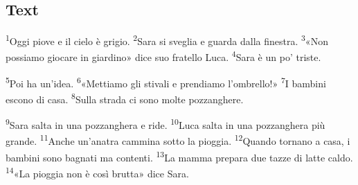 \documentclass[11pt,a4paper,twoside,openright]{book}
\newenvironment{storytext}{\par\begingroup\large\setlength{\parskip}{8pt}\linespread{1.15}\selectfont}{\par\endgroup}
\newcommand{\sentnum}[1]{\textsuperscript{\color{muted}\tiny #1}}
\begin{document}
\subsection*{Text}
\begin{storytext}
\sentnum{1}Oggi piove e il cielo è grigio. \sentnum{2}Sara si sveglia e guarda dalla finestra. \sentnum{3}«Non possiamo giocare in giardino» dice suo fratello Luca. \sentnum{4}Sara è un po' triste.\par
\sentnum{5}Poi ha un'idea. \sentnum{6}«Mettiamo gli stivali e prendiamo l'ombrello!» \sentnum{7}I bambini escono di casa. \sentnum{8}Sulla strada ci sono molte pozzanghere.\par
\sentnum{9}Sara salta in una pozzanghera e ride. \sentnum{10}Luca salta in una pozzanghera più grande. \sentnum{11}Anche un'anatra cammina sotto la pioggia. \sentnum{12}Quando tornano a casa, i bambini sono bagnati ma contenti. \sentnum{13}La mamma prepara due tazze di latte caldo. \sentnum{14}«La pioggia non è così brutta» dice Sara.\par
\end{storytext}
\end{document}
